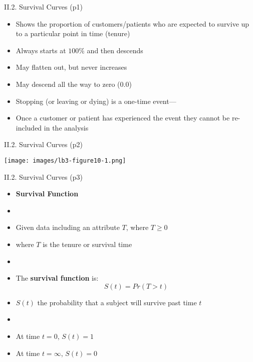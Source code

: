 \documentclass[handout]{beamer}
\newcommand{\stronger}[1]{\textbf{\color{purple} #1}}
\begin{document}
\begin{frame}{II.2. Survival Curves (p1)}
\begin{itemize}
\item Shows the proportion of customers/patients who are expected to survive up to a particular point in time (tenure)
\item Always starts at $100\%$  and then descends
\item May flatten out, but never increases
\item May descend all the way to zero ($0.0$)
\item Stopping (or leaving or dying) is a one-time event---
\item[] Once a customer or patient has experienced the event they cannot be re-included in the analysis
\end{itemize}
\end{frame}
\begin{frame}{II.2. Survival Curves (p2)}
\begin{center}
\texttt{[image: images/lb3-figure10-1.png]} \\
\cite[Figure 10.1]{LB3:2011}
\end{center}
\end{frame}
\begin{frame}{II.2. Survival Curves (p3)}
\begin{itemize}
\item[] \stronger{Survival Function}
\item[]
\item Given data including an attribute $T$, where $T \geq 0$
\item[] where $T$ is the tenure or survival time
\item[]
\item The \stronger{survival function} is:
\[
	S(t) = Pr(T>t)
\]
\item $S(t)$ the probability that a subject will survive past time $t$
\item[]
\item At time $t=0$, $S(t)=1$
\item At time $t=\infty$, $S(t)=0$
\end{itemize}
\end{frame}
\end{document}
